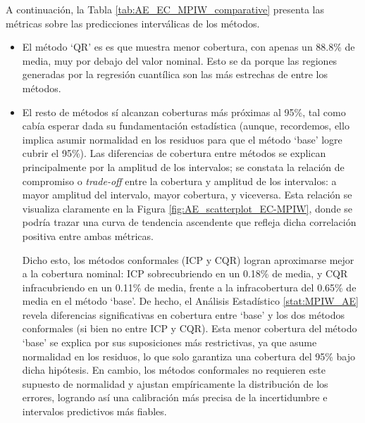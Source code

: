 A continuación, la Tabla \ref{tab:AE_EC_MPIW_comparative} presenta las métricas sobre las predicciones interválicas de los métodos. 

\begin{itemize}
    
    \item El método `QR' es es que muestra menor cobertura, con apenas un 88.8\% de media, muy por debajo del valor nominal. Esto se da porque las regiones generadas por la regresión cuantílica son las más estrechas de entre los métodos.
    
    \item El resto de métodos sí alcanzan coberturas más próximas al 95\%, tal como cabía esperar dada su fundamentación estadística (aunque, recordemos, ello implica asumir normalidad en los residuos para que el método `base' logre cubrir el 95\%). Las diferencias de cobertura entre métodos se explican principalmente por la amplitud de los intervalos; se constata la relación de compromiso o \textit{trade-off} entre la cobertura y amplitud de los intervalos: a mayor amplitud del intervalo, mayor cobertura, y viceversa. Esta relación se visualiza claramente en la Figura \ref{fig:AE_scatterplot_EC-MPIW}, donde se podría trazar una curva de tendencia ascendente que refleja dicha correlación positiva entre ambas métricas.
    
    Dicho esto, los métodos conformales (ICP y CQR) logran aproximarse mejor a la cobertura nominal: ICP sobrecubriendo en un 0.18\% de media, y CQR infracubriendo en un 0.11\% de media, frente a la infracobertura del 0.65\% de media en el método `base'. De hecho, el Análisis Estadístico \ref{stat:MPIW_AE} revela diferencias significativas en cobertura entre `base' y los dos métodos conformales (si bien no entre ICP y CQR). Esta menor cobertura del método `base' se explica por sus suposiciones más restrictivas, ya que asume normalidad en los residuos, lo que solo garantiza una cobertura del 95\% bajo dicha hipótesis. En cambio, los métodos conformales no requieren este supuesto de normalidad y ajustan empíricamente la distribución de los errores, logrando así una calibración más precisa de la incertidumbre e intervalos predictivos más fiables.
    
\end{itemize}


